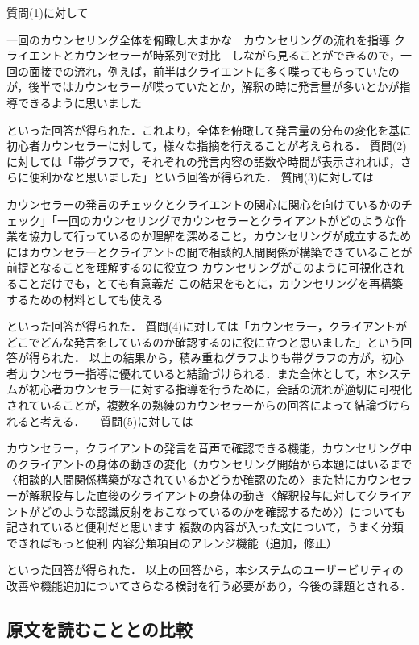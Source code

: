 \documentclass[shuuron]{kuee}
\begin{document}
質問(1)に対して

  一回のカウンセリング全体を俯瞰し大まかな　カウンセリングの流れを指導
  クライエントとカウンセラーが時系列で対比　しながら見ることができるので，一回の面接での流れ，例えば，前半はクライエントに多く喋ってもらっていたのが，後半ではカウンセラーが喋っていたとか，解釈の時に発言量が多いとかが指導できるように思いました

といった回答が得られた．これより，全体を俯瞰して発言量の分布の変化を基に初心者カウンセラーに対して，様々な指摘を行えることが考えられる．
質問(2)に対しては「帯グラフで，それぞれの発言内容の語数や時間が表示されれば，さらに便利かなと思いました」という回答が得られた．
質問(3)に対しては

  カウンセラーの発言のチェックとクライエントの関心に関心を向けているかのチェック」「一回のカウンセリングでカウンセラーとクライアントがどのような作業を協力して行っているのか理解を深めること，カウンセリングが成立するためにはカウンセラーとクライアントの間で相談的人間関係が構築できていることが前提となることを理解するのに役立つ
  カウンセリングがこのように可視化されることだけでも，とても有意義だ
  この結果をもとに，カウンセリングを再構築するための材料としても使える

といった回答が得られた．
質問(4)に対しては「カウンセラー，クライアントがどこでどんな発言をしているのか確認するのに役に立つと思いました」という回答が得られた．
以上の結果から，積み重ねグラフよりも帯グラフの方が，初心者カウンセラー指導に優れていると結論づけられる．また全体として，本システムが初心者カウンセラーに対する指導を行うために，会話の流れが適切に可視化されていることが，複数名の熟練のカウンセラーからの回答によって結論づけられると考える．
　質問(5)に対しては

  カウンセラー，クライアントの発言を音声で確認できる機能，カウンセリング中のクライアントの身体の動きの変化（カウンセリング開始から本題にはいるまで〈相談的人間関係構築がなされているかどうか確認のため〉また特にカウンセラーが解釈投与した直後のクライアントの身体の動き〈解釈投与に対してクライアントがどのような認識反射をおこなっているのかを確認するため〉）についても記されていると便利だと思います
  複数の内容が入った文について，うまく分類できればもっと便利
  内容分類項目のアレンジ機能（追加，修正）



といった回答が得られた．
以上の回答から，本システムのユーザービリティの　改善や機能追加についてさらなる検討を行う必要があり，今後の課題とされる．

\subsection{原文を読むこととの比較}
\end{document}
